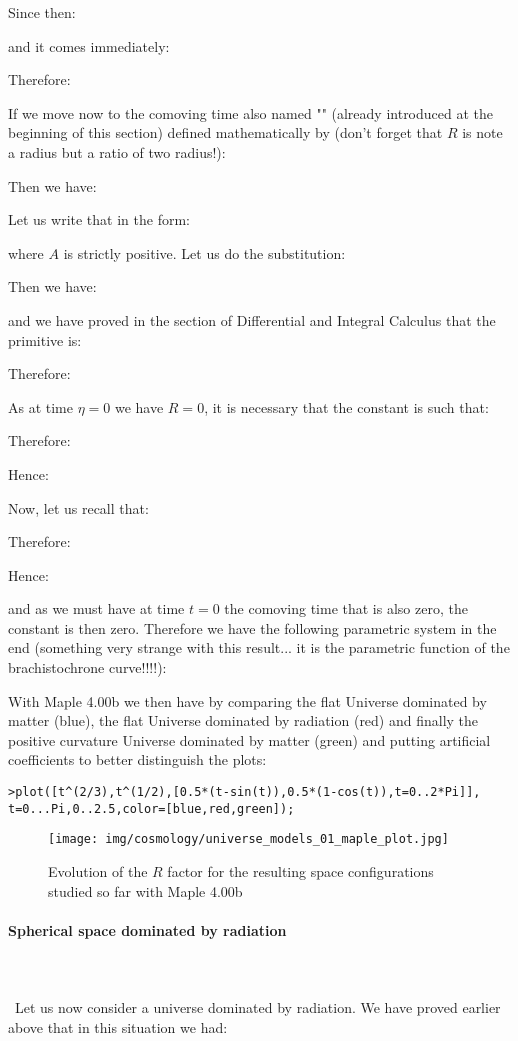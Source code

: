 	Since then:
	
	and it comes immediately:
	
	Therefore:
	
	If we move now to the comoving time also named "" (already introduced at the beginning of this section) defined mathematically by (don't forget that $R$ is note a radius but a ratio of two radius!):
	
	Then we have:
	
	Let us write that in the form:
	
	where $A$ is strictly positive. Let us do the substitution:
	
	Then we have:
	
	and we have proved in the section of Differential and Integral Calculus that the primitive is:
	
	Therefore:
	
	As at time $\eta=0$ we have $R=0$, it is necessary that the constant is such that:
	
	Therefore:
	
	Hence:
	
	Now, let us recall that:
	
	Therefore:
	
	Hence:
	
	and as we must have at time $t=0$ the comoving time that is also zero, the constant is then zero. Therefore we have the following parametric system in the end (something very strange with this result... it is the parametric function of the brachistochrone curve!!!!):
	
	With Maple 4.00b we then have by comparing the flat Universe dominated by matter (blue), the flat Universe dominated by radiation (red) and finally the positive curvature Universe dominated by matter (green) and putting artificial coefficients to better distinguish the plots:
	
	\texttt{>plot([t\string^(2/3),t\string^(1/2),[0.5*(t-sin(t)),0.5*(1-cos(t)),t=0..2*Pi]],\\
	t=0...Pi,0..2.5,color=[blue,red,green]);}
	\begin{figure}[H]
		\centering
		\texttt{[image: img/cosmology/universe\_models\_01\_maple\_plot.jpg]}
		\caption[]{Evolution of the $R$ factor for the resulting space configurations studied so far with Maple 4.00b}
	\end{figure}
	
	\paragraph{Spherical space dominated by radiation}\mbox{}\\\\\
	Let us now consider a universe dominated by radiation. We have proved earlier above that in this situation we had:
	
